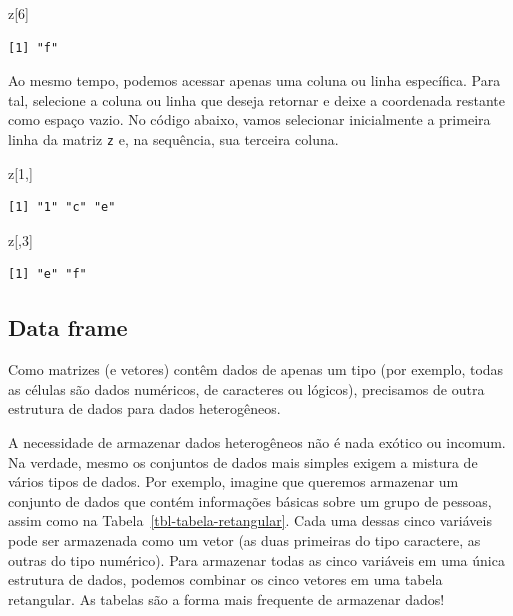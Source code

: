 \documentclass[
  letterpaper,
  DIV=11,
  numbers=noendperiod]{scrreprt}
\newenvironment{Shaded}{\begin{snugshade}}{\end{snugshade}}
\newcommand{\DecValTok}[1]{\textcolor[rgb]{0.68,0.00,0.00}{#1}}
\newcommand{\NormalTok}[1]{\textcolor[rgb]{0.00,0.23,0.31}{#1}}
\begin{document}
\begin{Shaded}
\begin{Highlighting}[]
\NormalTok{z[}\DecValTok{6}\NormalTok{]}
\end{Highlighting}
\end{Shaded}

\begin{verbatim}
[1] "f"
\end{verbatim}

Ao mesmo tempo, podemos acessar apenas uma coluna ou linha específica.
Para tal, selecione a coluna ou linha que deseja retornar e deixe a
coordenada restante como espaço vazio. No código abaixo, vamos
selecionar inicialmente a primeira linha da matriz \texttt{z} e, na
sequência, sua terceira coluna.

\begin{Shaded}
\begin{Highlighting}[]
\NormalTok{z[}\DecValTok{1}\NormalTok{,]}
\end{Highlighting}
\end{Shaded}

\begin{verbatim}
[1] "1" "c" "e"
\end{verbatim}

\begin{Shaded}
\begin{Highlighting}[]
\NormalTok{z[,}\DecValTok{3}\NormalTok{]}
\end{Highlighting}
\end{Shaded}

\begin{verbatim}
[1] "e" "f"
\end{verbatim}

\subsection{Data frame}\label{data-frame}

Como matrizes (e vetores) contêm dados de apenas um tipo (por exemplo,
todas as células são dados numéricos, de caracteres ou lógicos),
precisamos de outra estrutura de dados para dados heterogêneos.

A necessidade de armazenar dados heterogêneos não é nada exótico ou
incomum. Na verdade, mesmo os conjuntos de dados mais simples exigem a
mistura de vários tipos de dados. Por exemplo, imagine que queremos
armazenar um conjunto de dados que contém informações básicas sobre um
grupo de pessoas, assim como na Tabela~\ref{tbl-tabela-retangular}. Cada
uma dessas cinco variáveis pode ser armazenada como um vetor (as duas
primeiras do tipo caractere, as outras do tipo numérico). Para armazenar
todas as cinco variáveis em uma única estrutura de dados, podemos
combinar os cinco vetores em uma tabela retangular. As tabelas são a
forma mais frequente de armazenar dados!
\end{document}
